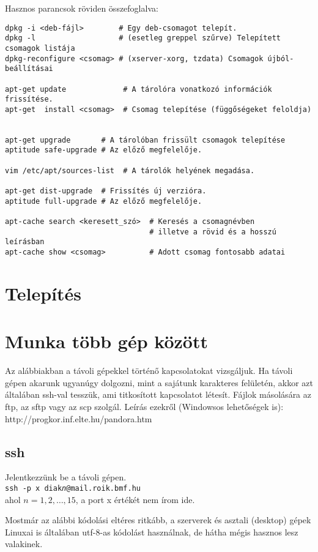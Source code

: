 \documentclass[a4paper]{article}
\begin{document}
Hasznos parancsok röviden összefoglalva:
\begin{verbatim}
dpkg -i <deb-fájl>        # Egy deb-csomagot telepít.
dpkg -l                   # (esetleg greppel szűrve) Telepített csomagok listája
dpkg-reconfigure <csomag> # (xserver-xorg, tzdata) Csomagok újból-beállításai

apt-get update             # A tárolóra vonatkozó információk frissítése.
apt-get  install <csomag>  # Csomag telepítése (függőségeket feloldja)


apt-get upgrade       # A tárolóban frissült csomagok telepítése
aptitude safe-upgrade # Az előző megfelelője.

vim /etc/apt/sources-list  # A tárolók helyének megadása.

apt-get dist-upgrade  # Frissítés új verzióra.
aptitude full-upgrade # Az előző megfelelője.

apt-cache search <keresett_szó>  # Keresés a csomagnévben
                                 # illetve a rövid és a hosszú leírásban
apt-cache show <csomag>          # Adott csomag fontosabb adatai
\end{verbatim}

\section{Telepítés}


\newpage
\section{Munka több gép között}

Az alábbiakban a távoli gépekkel történő kapcsolatokat vizsgáljuk. Ha
távoli gépen akarunk ugyanúgy dolgozni, mint a sajátunk karakteres
felületén, akkor azt általában ssh-val tesszük, ami titkosított
kapcsolatot létesít. Fájlok másolására az ftp, az sftp vagy az scp
szolgál. Leírás ezekről (Windowsos lehetőségek is):\\
http://progkor.inf.elte.hu/pandora.htm

\subsection{ssh}
Jelentkezzünk be a távoli gépen.\\
\texttt{ssh -p x diak\textit{n}@mail.roik.bmf.hu}\\
ahol $n=1,2,\dots,15$, a port x értékét nem írom ide.

Mostmár az alábbi kódolási eltéres ritkább, a szerverek és asztali
(desktop) gépek Linuxai is általában utf-8-as kódolást használnak, de
hátha mégis hasznos lesz valakinek.
\end{document}
